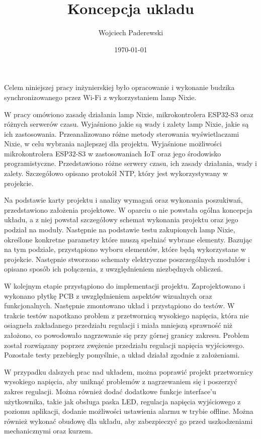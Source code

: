 \documentclass[../main.tex]{subfiles}
\author{Wojciech Paderewski}
\date{\today}
\title{Koncepcja ukladu}
\begin{document}
Celem niniejszej pracy inżynierskiej było opracowanie i wykonanie budzika synchronizowanego przez Wi-Fi z wykorzystaniem lamp Nixie.

W pracy omówiono zasadę działania lamp Nixie, mikrokontrolera ESP32-S3 oraz różnych serwerów czasu.
Wyjaśniono jakie są wady i zalety lamp Nixie, jakie są ich zastosowania. Przeanalizowano różne metody sterowania wyświetlaczami Nixie, w celu wybrania najlepszej dla projektu.
Wyjaśnione możliwości mikrokontrolera ESP32-S3 w zastosowaniach IoT oraz jego środowisko programistyczne.
Przedstawiono różne serwery czasu, ich zasady działania, wady i zalety. Szczegółowo opisano protokół NTP, który jest wykorzystywany w projekcie.

Na podstawie karty projektu i analizy wymagań oraz wykonania poszukiwań, przedstawiono założenia projektowe. W oparciu o nie powstała ogólna koncepcja układu,
a z niej powstał szczegółowy schemat wykonania projektu oraz jego podział na moduły. Następnie na podstawie testu zakupionych lamp Nixie, określone konkretne parametry które muszą spełniać wybrane elementy.
Bazując na tym podziale, przystąpiono wyboru elementów, które będą wykorzystane w projekcie. Następnie stworzono schematy elektryczne poszczególnych modułów i opisano sposób ich połączenia, z uwzględnieniem niezbędnych obliczeń.

W kolejnym etapie przystąpiono do implementacji projektu. Zaprojektowano i wykonano płytkę PCB z uwzględnieniem aspektów wizualnych oraz funkcjonalnych. Następnie zmontowano układ i przystąpiono do testów.
W trakcie testów napotkano problem z przetwornicą wysokiego napięcia, która nie osiagneła zakładanego przedziału regulacji i miała mniejszą sprawność niż założono, co powodowało nagrzewanie się przy górnej granicy zakresu. Problem został rozwiązany poprzez zwężenie przedziału regulacji napięcia wyjściowego.
Pozostałe testy przebiegły pomyślnie, a układ działał zgodnie z założeniami.

W przypadku dalszych prac nad układem, można poprawić projekt przetwornicy wysokiego napięcia, aby uniknąć problemów z nagrzewaniem się i poszerzyć zakres regulacji. Można również dodać dodatkowe funkcje interface'u użytkownika, 
takie jak obsługa paska LED, regulacja napięcia wyjściowego z poziomu aplikacji, dodanie możliwości ustawienia alarmu w trybie offline. Można również wykonać obudowę dla układu,
aby zabezpieczyć go przed uszkodzeniami mechanicznymi oraz kurzem.
\end{document}
